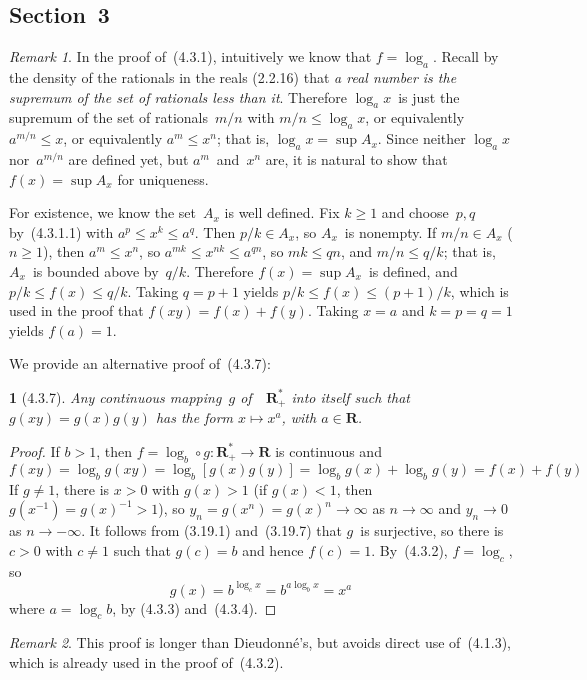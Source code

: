 \documentclass[letterpaper,12pt]{article}
\newcommand{\R}{\mathbf{R}}
\newcommand{\Rp}{\R_+}
\newcommand{\Rps}{\Rp^*}
\newcommand{\after}{\circ}
\newcommand{\inv}[1]{#1^{-1}}
\theoremstyle{plain}
\newtheorem*{prop}{}
\theoremstyle{definition}
\theoremstyle{remark}
\newtheorem*{rmk}{Remark}
\begin{document}
\subsection*{Section~3}
\begin{rmk}
In the proof of~(4.3.1), intuitively we know that \(f=\log_a\). Recall by the density of the rationals in the reals (2.2.16) that \emph{a real number is the supremum of the set of rationals less than it}. Therefore \(\log_a x\)~is just the supremum of the set of rationals~\(m/n\) with \(m/n\le\log_a x\), or equivalently \(a^{m/n}\le x\), or equivalently \(a^m\le x^n\); that is, \(\log_a x=\sup A_x\). Since neither \(\log_a x\) nor~\(a^{m/n}\) are defined yet, but \(a^m\)~and~\(x^n\) are, it is natural to show that \(f(x)=\sup A_x\) for uniqueness.

For existence, we know the set~\(A_x\) is well defined. Fix \(k\ge 1\) and choose~\(p,q\) by~(4.3.1.1) with \(a^p\le x^k\le a^q\). Then \(p/k\in A_x\), so \(A_x\)~is nonempty. If \(m/n\in A_x\) (\(n\ge 1\)), then \(a^m\le x^n\), so \(a^{mk}\le x^{nk}\le a^{qn}\), so \(mk\le qn\), and \(m/n\le q/k\); that is, \(A_x\)~is bounded above by~\(q/k\). Therefore \(f(x)=\sup A_x\)~is defined, and \(p/k\le f(x)\le q/k\). Taking \(q=p+1\) yields \(p/k\le f(x)\le(p+1)/k\), which is used in the proof that \(f(xy)=f(x)+f(y)\). Taking \(x=a\) and \(k=p=q=1\) yields \(f(a)=1\).


\end{rmk}

\noindent We provide an alternative proof of~(4.3.7):
\begin{prop}[4.3.7]
Any continuous mapping~\(g\) of~~\(\Rps\) into itself such that \(g(xy)=g(x)g(y)\) has the form \(x\mapsto x^a\), with \(a\in\R\).
\end{prop}
\begin{proof}
If \(b>1\), then \(f=\log_b\after g:\Rps\to\R\) is continuous and
\[f(xy)=\log_b g(xy)=\log_b[g(x)g(y)]=\log_b g(x)+\log_b g(y)=f(x)+f(y)\]
If \(g\ne1\), there is \(x>0\) with \(g(x)>1\) (if \(g(x)<1\), then \(g(\inv{x})=\inv{g(x)}>1\)), so \(y_n=g(x^n)=g(x)^n\to\infty\) as \(n\to\infty\) and \(y_n\to 0\) as \(n\to-\infty\). It follows from (3.19.1) and~(3.19.7) that \(g\)~is surjective, so there is \(c>0\) with \(c\ne 1\) such that \(g(c)=b\) and hence \(f(c)=1\). By~(4.3.2), \(f=\log_c\), so
\[g(x)=b^{\log_c x}=b^{a\log_b x}=x^a\]
where \(a=\log_c b\), by (4.3.3) and~(4.3.4).
\end{proof}
\begin{rmk}
This proof is longer than Dieudonn\'e's, but avoids direct use of~(4.1.3), which is already used in the proof of~(4.3.2).
\end{rmk}
\end{document}
